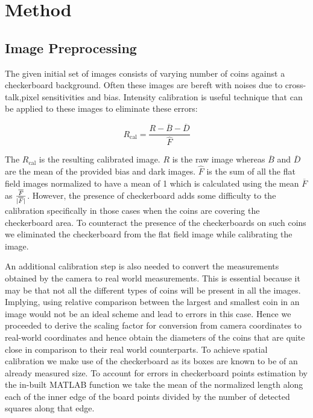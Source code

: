 \documentclass[report.tex]{subfile}
\begin{document}
\section{Method}

\subsection{Image Preprocessing}
The given initial set of images consists of varying number of coins against a
checkerboard background. Often these images are bereft with noises due to
cross-talk,pixel sensitivities and bias. Intensity calibration is useful
technique that can be applied to these images to eliminate these errors:

\begin{equation*}
    R_{\textrm{cal}} = \frac{R - \overline{B} - \overline{D}}{\hat{F}}
\end{equation*}

The $R_{\textrm{cal}}$ is the resulting calibrated image. $R$ is the raw image
whereas $\overline{B}$ and $\overline{D}$ are the mean of the provided bias and
dark images. $\hat{F}$ is the sum of all the flat field images normalized to
have a mean of 1 which is calculated using the mean $\overline{F}$ as
$\frac{\overline{F}}{\lvert\overline{F}\rvert}$. However, the presence of
checkerboard adds some difficulty to the calibration specifically in those
cases when the coins are covering the checkerboard area. To counteract the
presence of the checkerboards on such coins we eliminated the checkerboard from
the flat field image while calibrating the image.

An additional calibration step is also needed to convert the measurements
obtained by the camera to real world measurements. This is essential because it
may be that not all the different types of coins will be present in all the
images. Implying, using relative comparison between the largest and smallest
coin in an image would not be an ideal scheme and lead to errors in this case.
Hence we proceeded to derive the scaling factor for conversion from camera
coordinates to real-world coordinates and hence obtain the diameters of the
coins that are quite close in comparison to their real world counterparts. To
achieve spatial calibration we make use of the checkerboard as its boxes are
known to be of an already measured size. To account for errors in checkerboard
points estimation by the in-built MATLAB function we take the mean of the
normalized length along each of the inner edge of the board points divided by
the number of detected squares along that edge.
\end{document}
